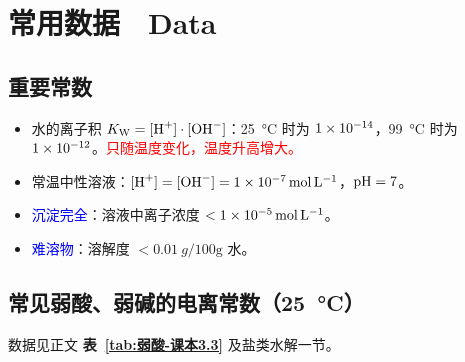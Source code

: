 \chapter{常用数据　Data}\label{appendix:常用数据}

    \section{重要常数}\label{app:数据-常数}

        \begin{itemize}
            \item 水的离子积 \(K_\text{W} = \cemh{[H+]} \cdot \cemh{[OH^-]}\)：\SI{25}{\degreeCelsius} 时为 \(\num{1E-14}\)，\SI{99}{\degreeCelsius} 时为 \(\num{1E-12}\)。\textcolor{red}{只随温度变化，温度升高增大。}
            \item 常温中性溶液：\(\cemh{[H+]} = \cemh{[OH^-]} = \SI{1E-7}{\mole\per\litre}\)，\(\cemh{pH} = 7\)。
            \item \textcolor{blue}{沉淀完全}：溶液中离子浓度 \(< \SI{1E-5}{\mole\per\litre}\)。
            \item \textcolor{blue}{难溶物}：溶解度 \(< \SI{0.01}{g}/100\text{g}\) 水。
        \end{itemize}

    \section{\texorpdfstring{常见弱酸、弱碱的电离常数（\SI{25}{\degreeCelsius}）}{常见弱酸、弱碱的电离常数（25℃）}}\label{app:数据-电离常数}

        数据见正文 \textbf{表~\ref{tab:弱酸-课本3.3}} 及盐类水解一节。

